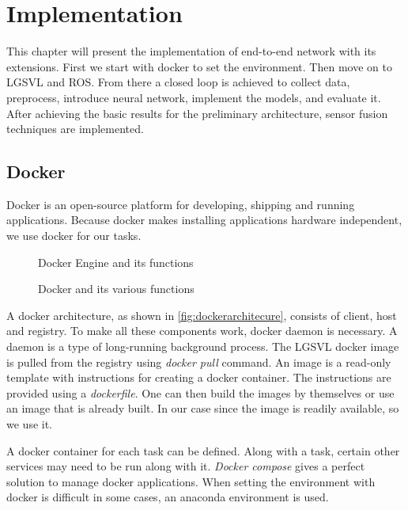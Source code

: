 \chapter{Implementation}
\label{chapter:implementation}
This chapter will present the implementation of end-to-end network with its extensions.
First we start with docker to set the environment. Then move on to LGSVL and ROS.
From there a closed loop is achieved to collect data, preprocess, introduce neural
network, implement the models, and evaluate it. After achieving the basic results for the
preliminary architecture, sensor fusion techniques are implemented.

\section{Docker}
Docker is an open-source platform for developing, shipping and running applications.
Because docker makes installing applications hardware independent, we use docker for our
tasks.
\begin{wrapfigure}{l}{0.5\textwidth}
	\centering
    \def\svgwidth{0.5\textwidth}
    \caption{Docker Engine and its functions}
    \label{fig:dockerengine}
\end{wrapfigure}


\begin{figure}[t]
	\centering
    \def\svgwidth{\textwidth}
    \caption{Docker and its various functions}
    \label{fig:docker1}
\end{figure}

A docker architecture, as shown in \ref{fig:dockerarchitecure}, consists of client, host
and registry. To make all these components work, docker daemon is necessary. A daemon is a
type of long-running background process. The LGSVL docker image is pulled from the registry using
\textit{docker pull} command. An image is a read-only template with instructions for
creating a docker container. The instructions are provided using a \textit{dockerfile}.
One can then build the images by themselves or use an image that is already built. In our
case since the image is readily available, so we use it.

A docker container for each task can be defined. Along with a task, certain other
services may need to be run along with it. \textit{Docker compose} gives a perfect
solution to manage docker applications.  When setting the environment with docker is difficult in some cases, an anaconda
environment \cite{anacondaenv} is used.

